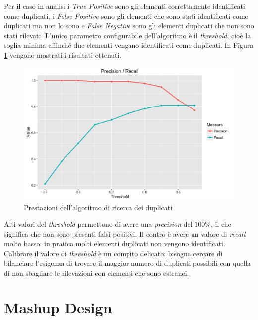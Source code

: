 Per il caso in analisi i \emph{True Positive} sono gli elementi correttamente identificati come duplicati, i \emph{False Positive} sono gli elementi che sono stati identificati come duplicati ma non lo sono e \emph{False Negative} sono gli elementi duplicati che non sono stati rilevati. L'unico parametro configurabile dell'algoritmo è il \emph{threshold}, cioè la soglia minima affinché due elementi vengano identificati come duplicati. In Figura \ref{fig:prestazioni-algoritmo-duplicati} vengono mostrati i risultati ottenuti.

\begin{figure}[ht]
	\centering
	\includegraphics[width=\textwidth]{4-metodologia/Immagini/similarity_precision_recall.png}
	\caption{Prestazioni dell'algoritmo di ricerca dei duplicati}\label{fig:prestazioni-algoritmo-duplicati}
\end{figure}

Alti valori del \emph{threshold} permettono di avere una \emph{precision} del $ 100\% $, il che significa che non sono presenti falsi positivi. Il contro è avere un valore di \emph{recall} molto basso: in pratica molti elementi duplicati non vengono identificati. Calibrare il valore di \emph{threshold} è un compito delicato: bisogna cercare di bilanciare l'esigenza di trovare il maggior numero di duplicati possibili con quella di non sbagliare le rilevazioni con elementi che sono estranei.

\section{Mashup Design\label{sec:mashup-design}}

